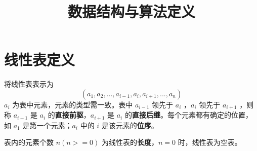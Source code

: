 \documentclass[12pt]{article}
\title{数据结构与算法定义}
\date{}
\begin{document}
\maketitle
\tableofcontents

\section{线性表定义}

将线性表表示为 $$(a_1, a_2, ..., a_{i-1}, a_i, a_{i+1}, ..., a_n)$$ $a_i$ 为表中元素，元素的类型需一致。表中 $a_{i-1}$ 领先于 $a_i$ ，$a_i$ 领先于 $a_{i+1}$ ，则称 $a_{i-1}$ 是 $a_i$ 的\textbf{直接前驱}，$a_{i+1}$ 是 $a_i$ 的\textbf{直接后继}。每个元素都有确定的位置，如 $a_1$ 是第一个元素；$a_i$ 中的 $i$ 是该元素的\textbf{位序}。

表内的元素个数 $n(n>=0)$ 为线性表的\textbf{长度}，$n=0$ 时，线性表为空表。
\end{document}
